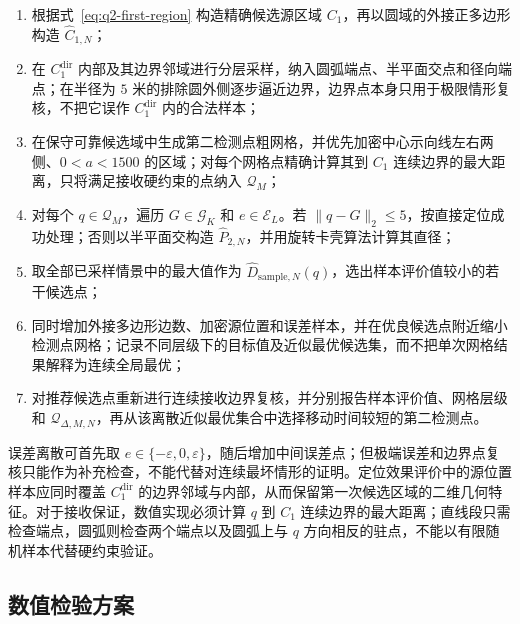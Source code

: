 \begin{enumerate}
  \item 根据式~\eqref{eq:q2-first-region} 构造精确候选源区域 $C_1$，再以圆域的外接正多边形构造 $\widehat C_{1,N}$；
  \item 在 $C_1^{\mathrm{dir}}$ 内部及其边界邻域进行分层采样，纳入圆弧端点、半平面交点和径向端点；在半径为 $5$ 米的排除圆外侧逐步逼近边界，边界点本身只用于极限情形复核，不把它误作 $C_1^{\mathrm{dir}}$ 内的合法样本；
  \item 在保守可靠候选域中生成第二检测点粗网格，并优先加密中心示向线左右两侧、$0<a<1500$ 的区域；对每个网格点精确计算其到 $C_1$ 连续边界的最大距离，只将满足接收硬约束的点纳入 $\mathcal Q_M$；
  \item 对每个 $q\in\mathcal Q_M$，遍历 $G\in\mathcal G_K$ 和 $e\in\mathcal E_L$。若 $\|q-G\|_2\leq5$，按直接定位成功处理；否则以半平面交构造 $\widehat P_{2,N}$，并用旋转卡壳算法计算其直径；
  \item 取全部已采样情景中的最大值作为 $\widehat D_{\mathrm{sample},N}(q)$，选出样本评价值较小的若干候选点；
  \item 同时增加外接多边形边数、加密源位置和误差样本，并在优良候选点附近缩小检测点网格；记录不同层级下的目标值及近似最优候选集，而不把单次网格结果解释为连续全局最优；
  \item 对推荐候选点重新进行连续接收边界复核，并分别报告样本评价值、网格层级和 $\mathcal Q_{\Delta,M,N}$，再从该离散近似最优集合中选择移动时间较短的第二检测点。
\end{enumerate}

误差离散可首先取 $e\in\{-\varepsilon,0,\varepsilon\}$，随后增加中间误差点；但极端误差和边界点复核只能作为补充检查，不能代替对连续最坏情形的证明。定位效果评价中的源位置样本应同时覆盖 $C_1^{\mathrm{dir}}$ 的边界邻域与内部，从而保留第一次候选区域的二维几何特征。对于接收保证，数值实现必须计算 $q$ 到 $C_1$ 连续边界的最大距离；直线段只需检查端点，圆弧则检查两个端点以及圆弧上与 $q$ 方向相反的驻点，不能以有限随机样本代替硬约束验证。

\subsection{数值检验方案}

